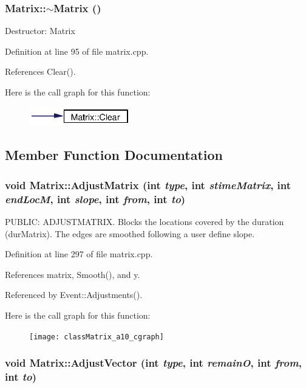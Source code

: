 \subsubsection{\setlength{\rightskip}{0pt plus 5cm}Matrix::$\sim${\bf Matrix} ()}\label{classMatrix_a2}


Destructor: Matrix 

Definition at line 95 of file matrix.cpp.

References Clear().

Here is the call graph for this function:\begin{figure}[H]
\begin{center}
\leavevmode
\includegraphics[width=125pt]{classMatrix_a2_cgraph}
\end{center}
\end{figure}


\subsection{Member Function Documentation}
\subsubsection{\setlength{\rightskip}{0pt plus 5cm}void Matrix::Adjust\-Matrix (int {\em type}, int {\em stime\-Matrix}, int {\em end\-Loc\-M}, int {\em slope}, int {\em from}, int {\em to})}\label{classMatrix_a10}


PUBLIC: ADJUSTMATRIX. Blocks the locations covered by the duration (dur\-Matrix). The edges are smoothed following a user define slope. 

Definition at line 297 of file matrix.cpp.

References matrix, Smooth(), and y.

Referenced by Event::Adjustments().

Here is the call graph for this function:\begin{figure}[H]
\begin{center}
\leavevmode
\texttt{[image: classMatrix\_a10\_cgraph]}
\end{center}
\end{figure}
\subsubsection{\setlength{\rightskip}{0pt plus 5cm}void Matrix::Adjust\-Vector (int {\em type}, int {\em remain\-O}, int {\em from}, int {\em to})}\label{classMatrix_a9}


